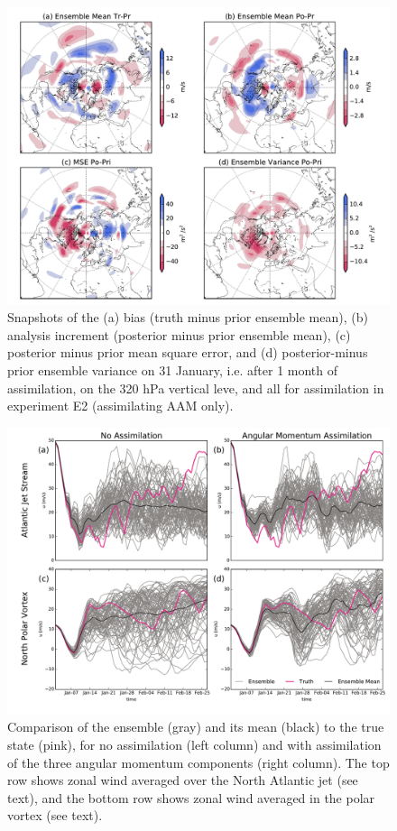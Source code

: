  \begin{figure}
	 \includegraphics[width=\textwidth]{Paper_figures/ERPDA_paper_U_priorerror_vs_increment_vs_ER_31jan.pdf}
	 \caption{Snapshots of the (a) bias (truth minus prior ensemble mean), (b) analysis increment (posterior minus prior ensemble mean), (c) posterior minus prior mean square error, and (d) posterior-minus prior ensemble variance on 31 January, i.e. after 1 month of assimilation, on the 320 hPa vertical leve, and all for assimilation in experiment E2 (assimilating AAM only). } 
 \label{fig:error_increments}
\end{figure}


 \begin{figure}
	 \includegraphics[width=\textwidth]{Paper_figures/ERPDA_paper_point_checks.pdf}
	 \caption{Comparison of the ensemble (gray) and its mean (black) to the true state (pink), for no assimilation (left column) and with assimilation of the three angular momentum components (right column). The top row shows zonal wind averaged over the North Atlantic jet (see text), and the bottom row shows zonal wind averaged in the polar vortex (see text).}
	 \label{fig:point_checks}
\end{figure}




